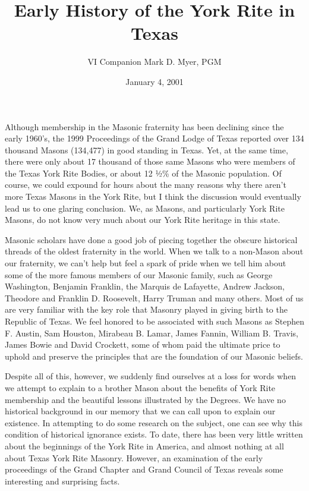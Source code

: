 \documentclass[letterpaper]{article}
\author{V\tridot{}I\tridot{} Companion Mark D. Myer, PGM}
\title{Early History of the York Rite in Texas}
\date{January 4, 2001}
\begin{document}
	
\maketitle

Although membership in the Masonic fraternity has been declining since the early 1960’s, the 1999
Proceedings of the Grand Lodge of Texas reported over 134 thousand Masons (134,477) in good
standing in Texas. Yet, at the same time, there were only about 17 thousand of those same Masons
who were members of the Texas York Rite Bodies, or about 12 ½\% of the Masonic population. Of
course, we could expound for hours about the many reasons why there aren’t more Texas Masons
in the York Rite, but I think the discussion would eventually lead us to one glaring conclusion.
We, as Masons, and particularly York Rite Masons, do not know very much about our York Rite
heritage in this state.

Masonic scholars have done a good job of piecing together the obscure historical threads of the
oldest fraternity in the world. When we talk to a non-Mason about our fraternity, we can’t help
but feel a spark of pride when we tell him about some of the more famous members of our Masonic
family, such as George Washington, Benjamin Franklin, the Marquis de Lafayette, Andrew Jackson,
Theodore and Franklin D. Roosevelt, Harry Truman and many others. Most of us are very familiar
with the key role that Masonry played in giving birth to the Republic of Texas. We feel honored to
be associated with such Masons as Stephen F. Austin, Sam Houston, Mirabeau B. Lamar, James
Fannin, William B. Travis, James Bowie and David Crockett, some of whom paid the ultimate price
to uphold and preserve the principles that are the foundation of our Masonic beliefs.

Despite all of this, however, we suddenly find ourselves at a loss for words when we attempt to
explain to a brother Mason about the benefits of York Rite membership and the beautiful lessons
illustrated by the Degrees. We have no historical background in our memory that we can call
upon to explain our existence. In attempting to do some research on the subject, one can see why
this condition of historical ignorance exists. To date, there has been very little written about the
beginnings of the York Rite in America, and almost nothing at all about Texas York Rite Masonry.
However, an examination of the early proceedings of the Grand Chapter and Grand Council of
Texas reveals some interesting and surprising facts.
\end{document}

